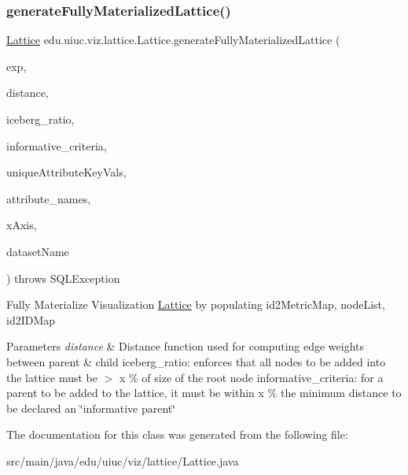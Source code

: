 \subsubsection{\texorpdfstring{generateFullyMaterializedLattice()}{generateFullyMaterializedLattice()}}
{\footnotesize\ttfamily \mbox{\hyperlink{classedu_1_1uiuc_1_1viz_1_1lattice_1_1_lattice}{Lattice}} edu.\+uiuc.\+viz.\+lattice.\+Lattice.\+generate\+Fully\+Materialized\+Lattice (\begin{DoxyParamCaption}\item[{\mbox{\hyperlink{classedu_1_1uiuc_1_1viz_1_1algorithms_1_1_experiment}{Experiment}}}]{exp,  }\item[{\mbox{\hyperlink{interfaceedu_1_1uiuc_1_1viz_1_1distance_1_1_distance}{Distance}}}]{distance,  }\item[{double}]{iceberg\+\_\+ratio,  }\item[{double}]{informative\+\_\+criteria,  }\item[{Hash\+Map$<$ String, Array\+List$<$ String $>$$>$}]{unique\+Attribute\+Key\+Vals,  }\item[{Array\+List$<$ String $>$}]{attribute\+\_\+names,  }\item[{String}]{x\+Axis,  }\item[{String}]{dataset\+Name }\end{DoxyParamCaption}) throws S\+Q\+L\+Exception}

Fully Materialize Visualization \mbox{\hyperlink{classedu_1_1uiuc_1_1viz_1_1lattice_1_1_lattice}{Lattice}} by populating id2\+Metric\+Map, node\+List, id2\+I\+D\+Map 
\begin{DoxyParams}{Parameters}
{\em distance} & Distance function used for computing edge weights between parent \& child iceberg\+\_\+ratio\+: enforces that all nodes to be added into the lattice must be $>$ x \% of size of the root node informative\+\_\+criteria\+: for a parent to be added to the lattice, it must be within x \% the minimum distance to be declared an \char`\"{}informative parent\char`\"{}\\
\hline
\end{DoxyParams}


The documentation for this class was generated from the following file\+:\begin{DoxyCompactItemize}
\item 
src/main/java/edu/uiuc/viz/lattice/Lattice.\+java\end{DoxyCompactItemize}
